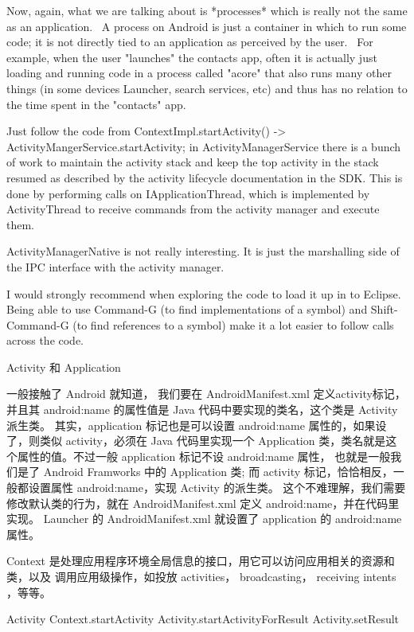 \documentclass{book}
\begin{document}
\begin{CJK}{UTF8}{gbsn}
Now, again, what we are talking about is *processes* which is really not the same as an application.  A process on Android is just a container in which to run some code; it is not directly tied to an application as perceived by the user.  For example, when the user "launches" the contacts app, often it is actually just loading and running code in a process called "acore" that also runs many other things (in some devices Launcher, search services, etc) and thus has no relation to the time spent in the "contacts" app. 





Just follow the code from ContextImpl.startActivity() -> ActivityMangerService.startActivity; in ActivityManagerService there is a bunch of work to maintain the activity stack and keep the top activity in the stack resumed as described by the activity lifecycle documentation in the SDK.  This is done by performing calls on IApplicationThread, which is implemented by ActivityThread to receive commands from the activity manager and execute them.


ActivityManagerNative is not really interesting.  It is just the marshalling side of the IPC interface with the activity manager.


I would strongly recommend when exploring the code to load it up in to Eclipse.  Being able to use Command-G (to find implementations of a symbol) and Shift-Command-G (to find references to a symbol) make it a lot easier to follow calls across the code.


Activity 和 Application

一般接触了 Android 就知道， 我们要在 AndroidManifest.xml
定义activity标记，并且其 android:name 的属性值是 Java
代码中要实现的类名，这个类是 Activity 派生类。 其实，application
标记也是可以设置 android:name 属性的，如果设了，则类似 activity，必须在 Java
代码里实现一个 Application 类，类名就是这个属性的值。不过一般 application
标记不设 android:name 属性， 也就是一般我们是了 Android Framworks 中的
Application 类; 而 activity 标记，恰恰相反，一般都设置属性
android:name，实现 Activity 的派生类。 这个不难理解，我们需要修改默认类的行为，就在 AndroidManifest.xml
定义 android:name，并在代码里实现。 Launcher 的 AndroidManifest.xml 就设置了
application 的 android:name 属性。

Context
是处理应用程序环境全局信息的接口，用它可以访问应用相关的资源和类，以及
调用应用级操作，如投放 activities， broadcasting， receiving intents ，等等。

Activity
Context.startActivity
Activity.startActivityForResult
Activity.setResult


\end{CJK}
\end{document}
